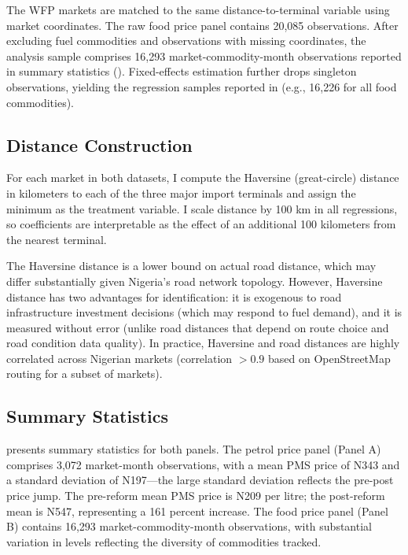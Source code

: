 \documentclass[12pt]{article}
\newcommand{\naira}{\textnigerian}
\renewcommand{\naira}{\mbox{\rlap{\hspace{0.09em}=}N}}
\begin{document}
The WFP markets are matched to the same distance-to-terminal variable using market coordinates. The raw food price panel contains 20,085 observations. After excluding fuel commodities and observations with missing coordinates, the analysis sample comprises 16,293 market-commodity-month observations reported in summary statistics (). Fixed-effects estimation further drops singleton observations, yielding the regression samples reported in  (e.g., 16,226 for all food commodities).

\subsection{Distance Construction}

For each market in both datasets, I compute the Haversine (great-circle) distance in kilometers to each of the three major import terminals and assign the minimum as the treatment variable. I scale distance by 100 km in all regressions, so coefficients are interpretable as the effect of an additional 100 kilometers from the nearest terminal.

The Haversine distance is a lower bound on actual road distance, which may differ substantially given Nigeria's road network topology. However, Haversine distance has two advantages for identification: it is exogenous to road infrastructure investment decisions (which may respond to fuel demand), and it is measured without error (unlike road distances that depend on route choice and road condition data quality). In practice, Haversine and road distances are highly correlated across Nigerian markets (correlation $> 0.9$ based on OpenStreetMap routing for a subset of markets).

\subsection{Summary Statistics}

 presents summary statistics for both panels. The petrol price panel (Panel A) comprises 3,072 market-month observations, with a mean PMS price of \naira{}343 and a standard deviation of \naira{}197---the large standard deviation reflects the pre-post price jump. The pre-reform mean PMS price is \naira{}209 per litre; the post-reform mean is \naira{}547, representing a 161 percent increase. The food price panel (Panel B) contains 16,293 market-commodity-month observations, with substantial variation in levels reflecting the diversity of commodities tracked.
\end{document}
